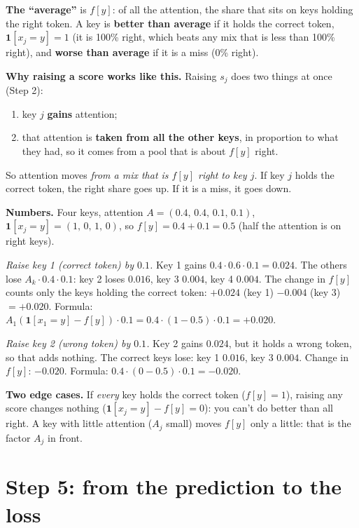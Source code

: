 \documentclass[11pt]{article}
\newcommand{\1}{\mathbf{1}}
\begin{document}
\begin{tcolorbox}[colback=orange!5,colframe=orange!60!black,title=What ``better than average'' means --- a worked example]
\textbf{The ``average''} is $f[y]$: of all the attention, the share that sits on keys holding the right
token. A key is \textbf{better than average} if it holds the correct token, $\1[x_j=y]=1$ (it is 100\% right, which beats any mix that
is less than 100\% right), and \textbf{worse than average} if it is a miss (0\% right).

\medskip
\textbf{Why raising a score works like this.} Raising $s_j$ does two things at once (Step 2):
\begin{enumerate}
\item key $j$ \textbf{gains} attention;
\item that attention is \textbf{taken from all the other keys}, in proportion to what they had, so it
comes from a pool that is about $f[y]$ right.
\end{enumerate}
So attention moves \emph{from a mix that is $f[y]$ right} \emph{to key $j$}. If key $j$ holds the correct token,
the right share goes up. If it is a miss, it goes down.

\medskip
\textbf{Numbers.} Four keys, attention $A=(0.4,\,0.4,\,0.1,\,0.1)$, $\1[x_j=y]=(1,\,0,\,1,\,0)$, so
$f[y]=0.4+0.1=0.5$ (half the attention is on right keys).

\smallskip
\emph{Raise key 1 (correct token) by $0.1$.} Key 1 gains $0.4\cdot0.6\cdot0.1=0.024$. The others lose
$A_k\cdot0.4\cdot0.1$: key 2 loses $0.016$, key 3 $0.004$, key 4 $0.004$. The change in
$f[y]$ counts only the keys holding the correct token: $+0.024$ (key 1) $-0.004$ (key 3) $=\mathbf{+0.020}$.
Formula: $A_1(\1[x_1=y]-f[y])\cdot0.1=0.4\cdot(1-0.5)\cdot0.1=+0.020$. \checkmark

\smallskip
\emph{Raise key 2 (wrong token) by $0.1$.} Key 2 gains $0.024$, but it holds a wrong token, so that adds nothing. The correct keys
lose: key 1 $0.016$, key 3 $0.004$. Change in $f[y]$: $\mathbf{-0.020}$.
Formula: $0.4\cdot(0-0.5)\cdot0.1=-0.020$. \checkmark

\medskip
\textbf{Two edge cases.} If \emph{every} key holds the correct token ($f[y]=1$), raising any score changes nothing
($\1[x_j=y]-f[y]=0$): you can't do better than all right. A key with little attention
($A_j$ small) moves $f[y]$ only a little: that is the factor $A_j$ in front.
\end{tcolorbox}

\section{Step 5: from the prediction to the loss}
\end{document}
